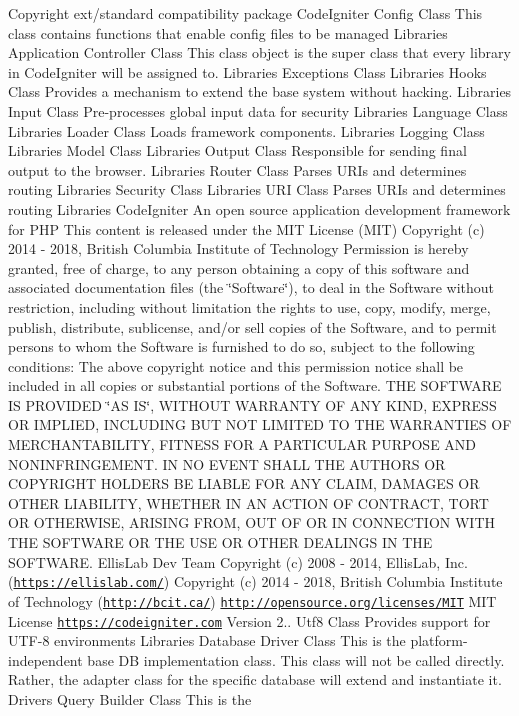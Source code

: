 \begin{DoxyCopyright}{Copyright}
ext/standard compatibility package  Code\+Igniter Config Class This class contains functions that enable config files to be managed  Libraries Application Controller Class This class object is the super class that every library in Code\+Igniter will be assigned to.  Libraries Exceptions Class  Libraries Hooks Class Provides a mechanism to extend the base system without hacking.  Libraries Input Class Pre-\/processes global input data for security  Libraries Language Class  Libraries Loader Class Loads framework components.  Libraries Logging Class  Libraries Model Class  Libraries Output Class Responsible for sending final output to the browser.  Libraries Router Class Parses U\+R\+Is and determines routing  Libraries Security Class  Libraries U\+RI Class Parses U\+R\+Is and determines routing  Libraries Code\+Igniter An open source application development framework for P\+HP This content is released under the M\+IT License (M\+IT) Copyright (c) 2014 -\/ 2018, British Columbia Institute of Technology Permission is hereby granted, free of charge, to any person obtaining a copy of this software and associated documentation files (the \char`\"{}\+Software\char`\"{}), to deal in the Software without restriction, including without limitation the rights to use, copy, modify, merge, publish, distribute, sublicense, and/or sell copies of the Software, and to permit persons to whom the Software is furnished to do so, subject to the following conditions\+: The above copyright notice and this permission notice shall be included in all copies or substantial portions of the Software. T\+HE S\+O\+F\+T\+W\+A\+RE IS P\+R\+O\+V\+I\+D\+ED \char`\"{}\+A\+S I\+S\char`\"{}, W\+I\+T\+H\+O\+UT W\+A\+R\+R\+A\+N\+TY OF A\+NY K\+I\+ND, E\+X\+P\+R\+E\+SS OR I\+M\+P\+L\+I\+ED, I\+N\+C\+L\+U\+D\+I\+NG B\+UT N\+OT L\+I\+M\+I\+T\+ED TO T\+HE W\+A\+R\+R\+A\+N\+T\+I\+ES OF M\+E\+R\+C\+H\+A\+N\+T\+A\+B\+I\+L\+I\+TY, F\+I\+T\+N\+E\+SS F\+OR A P\+A\+R\+T\+I\+C\+U\+L\+AR P\+U\+R\+P\+O\+SE A\+ND N\+O\+N\+I\+N\+F\+R\+I\+N\+G\+E\+M\+E\+NT. IN NO E\+V\+E\+NT S\+H\+A\+LL T\+HE A\+U\+T\+H\+O\+RS OR C\+O\+P\+Y\+R\+I\+G\+HT H\+O\+L\+D\+E\+RS BE L\+I\+A\+B\+LE F\+OR A\+NY C\+L\+A\+IM, D\+A\+M\+A\+G\+ES OR O\+T\+H\+ER L\+I\+A\+B\+I\+L\+I\+TY, W\+H\+E\+T\+H\+ER IN AN A\+C\+T\+I\+ON OF C\+O\+N\+T\+R\+A\+CT, T\+O\+RT OR O\+T\+H\+E\+R\+W\+I\+SE, A\+R\+I\+S\+I\+NG F\+R\+OM, O\+UT OF OR IN C\+O\+N\+N\+E\+C\+T\+I\+ON W\+I\+TH T\+HE S\+O\+F\+T\+W\+A\+RE OR T\+HE U\+SE OR O\+T\+H\+ER D\+E\+A\+L\+I\+N\+GS IN T\+HE S\+O\+F\+T\+W\+A\+RE.  Ellis\+Lab Dev Team  Copyright (c) 2008 -\/ 2014, Ellis\+Lab, Inc. (\href{https://ellislab.com/}{\tt https\+://ellislab.\+com/})  Copyright (c) 2014 -\/ 2018, British Columbia Institute of Technology (\href{http://bcit.ca/}{\tt http\+://bcit.\+ca/})  \href{http://opensource.org/licenses/MIT}{\tt http\+://opensource.\+org/licenses/\+M\+IT} M\+IT License  \href{https://codeigniter.com}{\tt https\+://codeigniter.\+com}  Version 2..  Utf8 Class Provides support for U\+T\+F-\/8 environments  Libraries Database Driver Class This is the platform-\/independent base DB implementation class. This class will not be called directly. Rather, the adapter class for the specific database will extend and instantiate it.  Drivers Query Builder Class This is the 
\end{DoxyCopyright}
